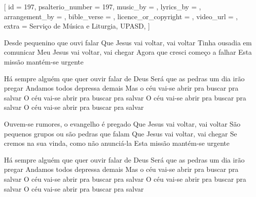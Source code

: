 [
    id                     = {197},
    psalterio_number       = {197},
    music_by               = {},
    lyrics_by              = {},
    arrangement_by         = {},
    bible_verse            = {},
    licence_or_copyright   = {},
    video_url              = {},
    extra                  = {Serviço de Música e Liturgia, UPASD},
]


\beginverse
Desde pequenino que ouvi falar
Que Jesus vai voltar, vai voltar
Tinha ousadia em comunicar
Meu Jesus vai voltar, vai chegar
Agora que cresci começo a falhar
Esta missão mantém-se urgente
\endverse


\beginchorus
Há sempre alguém que quer ouvir falar de Deus
Será que as pedras um dia irão pregar
Andamos todos depressa demais
Mas o céu vai-se abrir pra buscar pra salvar
O céu vai-se abrir pra buscar pra salvar
O céu vai-se abrir pra buscar pra salvar
O céu vai-se abrir pra buscar pra salvar
\endchorus


\beginverse
Ouvem-se rumores, o evangelho é pregado
Que Jesus vai voltar, vai voltar
São pequenos grupos ou são pedras que falam
Que Jesus vai voltar, vai chegar
Se cremos na sua vinda, como não anunciá-la
Esta missão mantém-se urgente
\endverse


\beginchorus
Há sempre alguém que quer ouvir falar de Deus
Será que as pedras um dia irão pregar
Andamos todos depressa demais
Mas o céu vai-se abrir pra buscar pra salvar
O céu vai-se abrir pra buscar pra salvar
O céu vai-se abrir pra buscar pra salvar
O céu vai-se abrir pra buscar pra salvar
\endchorus


\endsong
